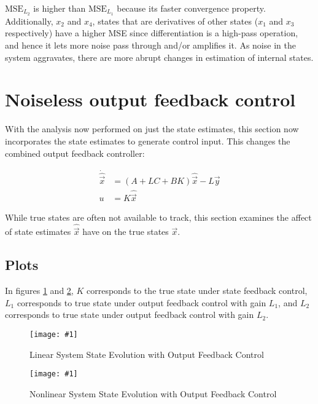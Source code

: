 \documentclass[10pt]{article}
\newcommand{\shrinkimage}[1]{\texttt{[image: \#1]}}
\begin{document}
$\text{MSE}_{L_2}$ is higher than $\text{MSE}_{L_1}$ because its faster convergence property. Additionally, $x_2$ and $x_4$, states that are derivatives of other states ($x_1$ and $x_3$ respectively) have a higher MSE since differentiation is a high-pass operation, and hence it lets more noise pass through and/or amplifies it. As noise in the system aggravates, there are more abrupt changes in estimation of internal states.

\section{Noiseless output feedback control} 
With the analysis now performed on just the state estimates, this section now incorporates the state estimates to generate control input. This changes the combined output feedback controller:

\begin{align*}
    \dot{\hat{\vec{x}}} &= (A + LC + BK)\hat{\vec{x}} - L\vec{y} \\
    u &= K\hat{\vec{x}}
\end{align*}

While true states are often not available to track, this section examines the affect of state estimates $\hat{\vec{x}}$ have on the true states $\vec{x}$. 

\subsection{Plots}
In figures \ref{fig:lin_noiseless_state_est_error_feedback} and \ref{fig:nlin_noiseless_state_est_error_feedback}, $K$ corresponds to the true state under state feedback control, $L_1$ corresponds to true state under output feedback control with gain $L_1$, and $L_2$ corresponds to true state under output feedback control with gain $L_2$. 

\begin{figure}[h]
    \centering
    \shrinkimage{lab4/figs/lin_noiseless_state_est_error_feedback.pdf}
    \caption{Linear System State Evolution with Output Feedback Control}
    \label{fig:lin_noiseless_state_est_error_feedback}
\end{figure}

\begin{figure}[h]
    \centering
    \shrinkimage{lab4/figs/nlin_noiseless_state_est_error_feedback.pdf}
    \caption{Nonlinear System State Evolution with Output Feedback Control}
    \label{fig:nlin_noiseless_state_est_error_feedback}
\end{figure}
\end{document}
